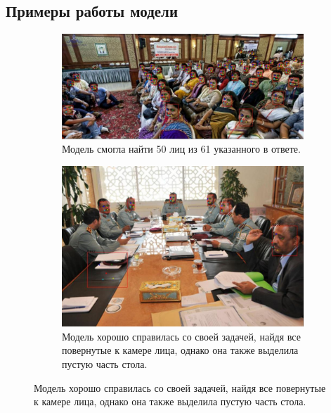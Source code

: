 \subsection{Примеры работы модели}\label{subsec:примеры-работы-модели}
\begin{figure}[h!]
    \centering
    \begin{subfigure}[b]{1.02\linewidth}
        \includegraphics[width=\linewidth]{images/good1.jpg}
        \caption{Модель смогла найти 50 лиц из 61 указанного в ответе.}
    \end{subfigure}

    \centering
    \begin{subfigure}[b]{1.02\linewidth}
        \includegraphics[width=\linewidth]{images/norm1.jpg}
        \caption{Модель хорошо справилась со своей задачей, найдя все повернутые к камере лица, однако она также выделила пустую часть стола.}
    \end{subfigure}
\end{figure}
